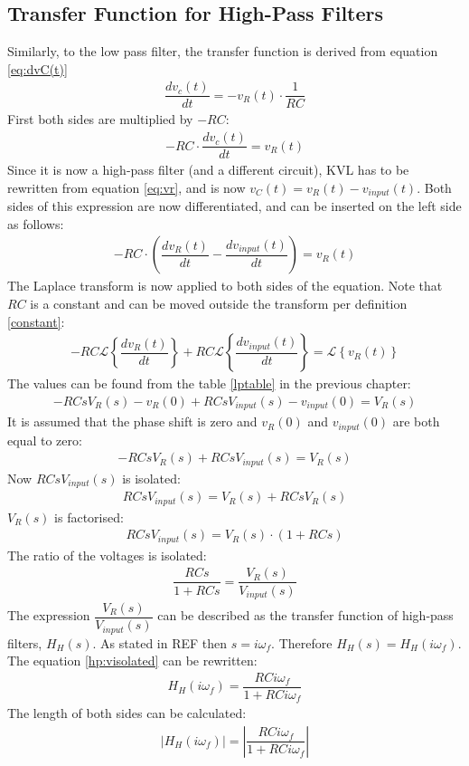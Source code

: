 \subsection{Transfer Function for High-Pass Filters}
Similarly, to the low pass filter, the transfer function is derived from equation \eqref{eq:dvC(t)} 
\begin{align}
\dfrac{dv_{c}(t)}{dt} = -v_{R}(t) \cdot \dfrac{1}{RC}
\end{align}
First both sides are multiplied by $-RC$:
\begin{align}
-RC \cdot \dfrac{dv_{c}(t)}{dt} = v_{R}(t)
\end{align}
Since it is now a high-pass filter (and a different circuit), KVL has to be rewritten from equation \eqref{eq:vr}, and is now $v_{C}(t)=v_{R}(t)-v_{input}(t)$. Both sides of this expression are now differentiated, and can be inserted on the left side as follows:
\begin{align*}
-RC \cdot \left(\dfrac{dv_{R}(t)}{dt} - \dfrac{dv_{input}(t)}{dt} \right) = v_{R}(t)
\end{align*}
The Laplace transform is now applied to both sides of the equation. Note that $RC$ is a constant and can be moved outside the transform per definition \ref{constant}:
\begin{align*}
-RC \mathcal{L} \left\{\dfrac{dv_{R}(t)}{dt} \right\} + RC \mathcal{L} \left\{ \dfrac{dv_{input}(t)}{dt} \right\} = \mathcal{L} \left\{v_{R}(t) \right\}
\end{align*}
The values can be found from the table \ref{lptable} in the previous chapter:
\begin{align*}
-RCsV_{R}(s)-v_{R}(0) + RCsV_{input}(s)-v_{input}(0) = V_{R}(s)
\end{align*}
It is assumed that the phase shift is zero and $v_{R}(0)$ and $v_{input}(0)$ are both equal to zero:
\begin{align*}
-RCsV_{R}(s) + RCsV_{input}(s) = V_{R}(s)
\end{align*}
Now $RCs V_{input}(s)$ is isolated:
\begin{align*}
RCsV_{input}(s) = V_{R}(s) + RCsV_{R}(s)
\end{align*}
$V_{R}(s)$ is factorised:
\begin{align*}
RCsV_{input}(s) = V_{R}(s) \cdot (1 + RCs)
\end{align*}
The ratio of the voltages is isolated:
\begin{align} \label{hp:visolated}
\dfrac{RCs}{1 + RCs} = \dfrac{V_{R}(s)}{V_{input}(s)}
\end{align}
The expression $\dfrac{V_{R}(s)}{V_{input}(s)}$ can be described as the transfer function of high-pass filters, $H_{H}(s)$. As stated in REF then $s=i \omega_f$. Therefore $H_{H}(s)=H_{H}(i \omega_f)$. The equation \eqref{hp:visolated} can be rewritten:
\begin{align*}
H_{H}(i \omega_f) = \dfrac{RCi \omega_f}{1 + RCi \omega_f}
\end{align*}
The length of both sides can be calculated:
\begin{align*}
\left|H_{H}(i \omega_f)\right| = \left|\dfrac{RCi \omega_f}{1 + RCi \omega_f} \right|
\end{align*}
